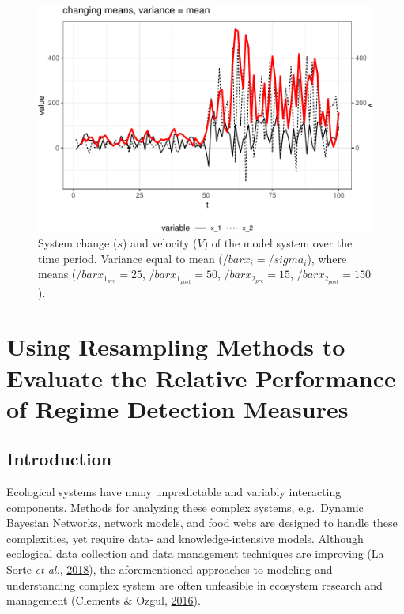 \documentclass[12pt,twoside,openany]{reedthesis}
\begin{document}
\newpage
\begin{figure}[bth]

{\centering \includegraphics[width=0.85\linewidth]{_myDissertation_files/figure-latex/velocSysEx4-1} 

}

\caption{System change ($s$) and velocity ($V$) of the model system over the time period. Variance equal to mean ($/bar{x_i}=/sigma_i$), where means ($/bar{x}_{1_{pre}}=25$, $/bar{x}_{1_{post}}=50$, $/bar{x}_{2_{pre}}=15$, $/bar{x}_{2_{post}}=150$).}\label{fig:velocSysEx4}
\end{figure}
\hypertarget{resampling}{%
\chapter{Using Resampling Methods to Evaluate the Relative Performance of Regime Detection Measures}\label{resampling}}

\hypertarget{introduction-4}{%
\section{Introduction}\label{introduction-4}}

Ecological systems have many unpredictable and variably interacting components. Methods for analyzing these complex systems, e.g.~Dynamic Bayesian Networks, network models, and food webs are designed to handle these complexities, yet require data- and knowledge-intensive models. Although ecological data collection and data management techniques are improving (La Sorte \emph{et al.}, \protect\hyperlink{ref-lasorte2018opportunities}{2018}), the aforementioned approaches to modeling and understanding complex system are often unfeasible in ecosystem research and management (Clements \& Ozgul, \protect\hyperlink{ref-clements_including_2016}{2016}).
\end{document}
